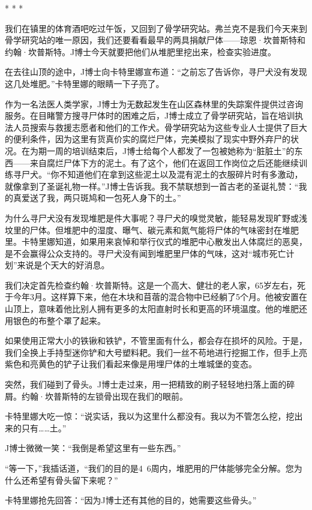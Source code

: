 \documentclass[12pt,oneside]{book}
\begin{document}
\begin{bookref}[frametitle={\cite{好好告别：世界葬礼观察手记}}]
\begin{center}
* * *
\end{center}

我们在镇里的体育酒吧吃过午饭，又回到了骨学研究站。弗兰克不是我们今天来到骨学研究站的唯一原因，我们还要看看最早的两具捐献尸体——琼恩·坎普斯特和约翰·坎普斯特。J博士今天就要把他们从堆肥里挖出来，检查实验进度。

在去往山顶的途中，J博士向卡特里娜宣布道：“之前忘了告诉你，寻尸犬没有发现这几处堆肥。”卡特里娜的眼睛一下子亮了。

作为一名法医人类学家，J博士为无数起发生在山区森林里的失踪案件提供过咨询服务。在目睹警方搜寻尸体时的困难之后，J博士成立了骨学研究站，旨在培训执法人员搜索与救援志愿者和他们的工作犬。骨学研究站为这些专业人士提供了巨大的便利条件，因为这里有货真价实的腐烂尸体，完美模拟了现实中野外弃尸的状况。在为期一周的培训结束后，J博士给每个人都发了一包被她称为“脏脏土”的东西——来自腐烂尸体下方的泥土。有了这个，他们在返回工作岗位之后还能继续训练寻尸犬。“你不知道他们在拿到这些泥土以及混有泥土的衣服碎片时有多激动，就像拿到了圣诞礼物一样。”J博士告诉我。我不禁联想到一首古老的圣诞礼赞：“我的真爱送了我，两只斑鸠和一包死人身下的土。”

为什么寻尸犬没有发现堆肥是件大事呢？寻尸犬的嗅觉灵敏，能轻易发现旷野或浅坟里的尸体。但堆肥中的湿度、曝气、碳元素和氮气能将尸体的气味密封在堆肥里。卡特里娜知道，如果用来哀悼和举行仪式的堆肥中心散发出人体腐烂的恶臭，是不会赢得公众支持的。寻尸犬没有闻到堆肥里尸体的气味，这对“城市死亡计划”来说是个天大的好消息。

我们决定首先检查约翰·坎普斯特。这是一个高大、健壮的老人家，65岁左右，死于今年3月。这样算下来，他在木块和苜蓿的混合物中已经躺了5个月。他被安置在山顶上，意味着他比别人拥有更多的太阳直射时长和更高的环境温度。他的堆肥还用银色的布整个罩了起来。

如果使用正常大小的铁锹和铁铲，不管里面有什么，都会存在损坏的风险。于是，我们全换上手持型迷你铲和大号塑料耙。我们一丝不苟地进行挖掘工作，但手上亮紫色和亮黄色的铲子让我们看起来像是用埋尸体的土堆城堡的变态。

突然，我们碰到了骨头。J博士走过来，用一把精致的刷子轻轻地扫落上面的碎屑。约翰·坎普斯特的左锁骨出现在我们的眼前。

卡特里娜大吃一惊：“说实话，我以为这里什么都没有。我以为不管怎么挖，挖出来的只有……土。”

J博士微微一笑：“我倒是希望这里有一些东西。”

“等一下，”我插话道，“我们的目的是4~6周内，堆肥用的尸体能够完全分解。您为什么还希望有骨头留下来呢？”

卡特里娜抢先回答：“因为J博士还有其他的目的，她需要这些骨头。”


\end{bookref}
\end{document}
